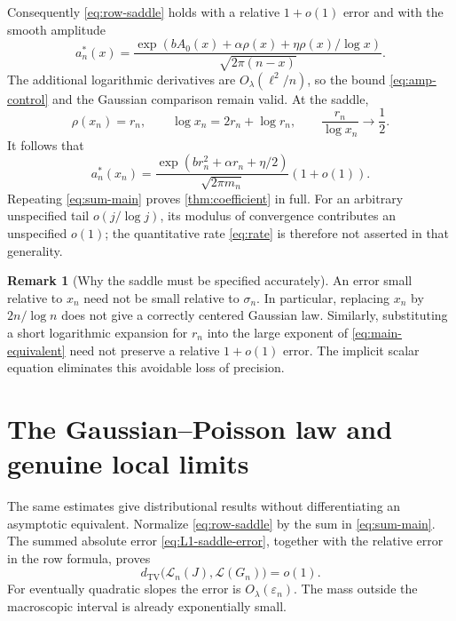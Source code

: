 \documentclass[11pt,a4paper]{article}
\theoremstyle{definition}
\newtheorem{remark}[theorem]{Remark}
\newcommand{\TV}{d_{\mathrm{TV}}}
\newcommand{\epsn}{\varepsilon_n}
\numberwithin{equation}{section}
\begin{document}
Consequently \eqref{eq:row-saddle} holds with a relative \(1+o(1)\)
error and with the smooth amplitude
\begin{equation}
 a_n^*(x)=\frac{\exp\!\left(bA_0(x)+\alpha\rho(x)
                           +\eta\rho(x)/\log x\right)}
                   {\sqrt{2\pi(n-x)}}.
 \label{eq:perturbed-amplitude}
\end{equation}
The additional logarithmic derivatives are
\(O_\lambda(\ell^2/n)\), so the bound
\eqref{eq:amp-control} and the Gaussian comparison remain valid.
At the saddle,
\[
 \rho(x_n)=r_n,\qquad
 \log x_n=2r_n+\log r_n,\qquad
 \frac{r_n}{\log x_n}\longrightarrow\frac12.
\]
It follows that
\[
 a_n^*(x_n)=
 \frac{\exp(br_n^2+\alpha r_n+\eta/2)}{\sqrt{2\pi m_n}}
                       (1+o(1)).
\]
Repeating \eqref{eq:sum-main} proves \cref{thm:coefficient} in full.
For an arbitrary unspecified tail \(o(j/\log j)\), its modulus of
convergence contributes an unspecified \(o(1)\); the quantitative rate
\eqref{eq:rate} is therefore not asserted in that generality.

\begin{remark}[Why the saddle must be specified accurately]
An error small relative to \(x_n\) need not be small relative to
\(\sigma_n\). In particular, replacing \(x_n\) by
\(2n/\log n\) does not give a correctly centered Gaussian law. Similarly,
substituting a short logarithmic expansion for \(r_n\) into the large
exponent of \eqref{eq:main-equivalent} need not preserve a relative
\(1+o(1)\) error. The implicit scalar equation eliminates this avoidable
loss of precision.
\end{remark}

\section{The Gaussian--Poisson law and genuine local limits}
\label{sec:probability-proof}
The same estimates give distributional results without differentiating an
asymptotic equivalent. Normalize \eqref{eq:row-saddle} by the sum in
\eqref{eq:sum-main}. The summed absolute error
\eqref{eq:L1-saddle-error}, together with the relative error in the row
formula, proves
\begin{equation}
 \TV\bigl(\mathcal L_n(J),\mathcal L(G_n)\bigr)=o(1).
 \label{eq:J-TV}
\end{equation}
For eventually quadratic slopes the error is \(O_\lambda(\epsn)\).
The mass outside the macroscopic interval is already exponentially small.
\end{document}
